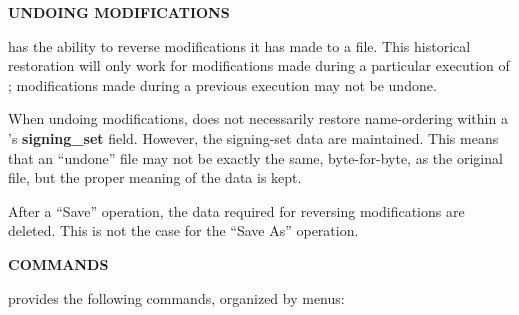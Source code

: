 {\bf UNDOING MODIFICATIONS}

 has the ability to reverse modifications it has made to a
 file.  This historical restoration will only work for
modifications made during a particular execution of ;
modifications made during a previous execution may not be undone.

When undoing modifications,  does not necessarily restore
name-ordering within a 's {\bf signing\_set} field.  However,
the signing-set data are maintained.  This means that an ``undone''
 file may not be exactly the same, byte-for-byte, as the
original file, but the proper meaning of the data is kept.

After a ``Save'' operation, the data required for reversing modifications are
deleted.  This is not the case for the ``Save As'' operation.

{\bf COMMANDS}

 provides the following commands, organized by menus:

